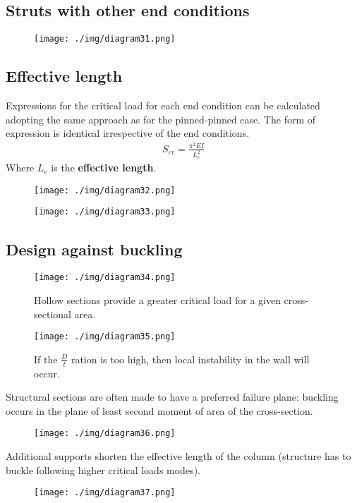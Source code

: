 \subsection{Struts with other end conditions}
\begin{figure}[H]
  \centering
  \texttt{[image: ./img/diagram31.png]}
  \caption{}
\end{figure}
\subsection{Effective length}
Expressions for the critical load for each end condition can be calculated adopting the same approach as for the pinned-pinned case. The form of expression is identical irrespective of the end conditions.
\begin{align}
  S_{cr} = \frac{\pi^2 EI}{L^2_e}
\end{align}
Where $L_e$ is the \textbf{effective length}.
\begin{figure}[H]
  \centering
  \texttt{[image: ./img/diagram32.png]}
  \caption{}
\end{figure}
\begin{figure}[H]
  \centering
  \texttt{[image: ./img/diagram33.png]}
  \caption{}
\end{figure}
\subsection{Design against buckling}
\begin{figure}[H]
  \centering
  \texttt{[image: ./img/diagram34.png]}
  \caption{Hollow sections provide a greater critical load for a given cross-sectional area.}
\end{figure}
\begin{figure}[H]
  \centering
  \texttt{[image: ./img/diagram35.png]}
  \caption{If the $\frac{D}{t}$ ration is too high, then local instability in the wall will occur.}
\end{figure}
Structural sections are often made to have a preferred failure plane: buckling occurs in the plane of least second moment of area of the cross-section.
\begin{figure}[H]
  \centering
  \texttt{[image: ./img/diagram36.png]}
  \caption{}
\end{figure}
Additional supports shorten the effective length of the column (structure has to buckle following higher critical loads modes).
\begin{figure}[H]
  \centering
  \texttt{[image: ./img/diagram37.png]}
  \caption{}
\end{figure}